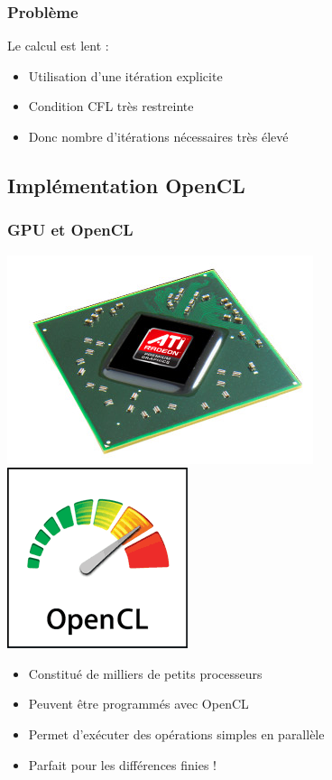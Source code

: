 \documentclass[10pt]{beamer}
\begin{document}
    \begin{frame}
    \frametitle{Problème}

    \alert{Le calcul est lent :}
    \begin{itemize}
    \item Utilisation d'une itération explicite

    \item Condition CFL très restreinte

    \item Donc nombre d'itérations nécessaires très élevé
    \end{itemize}
    \end{frame}

    \subsection{Implémentation OpenCL}

    \begin{frame}
    \frametitle{GPU et OpenCL}

    \begin{center}
    \includegraphics[scale=0.2]{gpu.jpg}
    \includegraphics[scale=0.2]{opencl.png}
    \end{center}
    \begin{itemize}

    \item Constitué de milliers de petits processeurs\\

    \item Peuvent être programmés avec OpenCL \\

    \item Permet d'exécuter des opérations simples en parallèle \\

    \item<2> \alert{ Parfait pour les différences finies !}

    \end{itemize}
    \end{frame}
\end{document}
